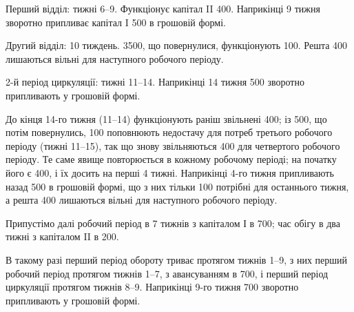 Перший відділ: тижні 6--9. Функціонує капітал II \deq{} 400.
Наприкінці 9 тижня зворотно припливає капітал I \deq{} 500 в грошовій
формі.

Другий відділ: 10 тиждень. \num{3500}, що повернулися, функціонують
100. Решта 400 лишаються вільні для наступного
робочого періоду.

2-й період циркуляції: тижні 11--14. Наприкінці 14 тижня 500 зворотно припливають у грошовій формі.

До кінця 14-го тижня (11--14) функціонують раніш звільнені 400; із 500, що потім повернулись, 100 поповнюють
недостачу для потреб третього робочого періоду (тижні 11--15),
так що знову звільняються 400 для четвертого робочого періоду.
Те саме явище повторюється в кожному робочому періоді; на
початку його є 400, і їх досить на перші 4 тижні. Наприкінці
4-го тижня припливають назад 500 в грошовій формі, що з
них тільки 100 потрібні для останнього тижня, а решта 400 лишаються вільні для наступного робочого періоду.

Припустімо далі робочий період в 7 тижнів з капіталом І в 700; час обігу в два тижні з капіталом II в 200.

В такому разі перший період обороту триває протягом тижнів 1--9,
з них перший робочий період протягом тижнів 1--7, з авансуванням
в 700, і перший період циркуляції протягом тижнів 8--9. Наприкінці
9-го тижня 700 зворотно припливають у грошовій формі.
